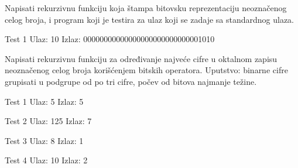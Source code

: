 \begin{Exercise}[label=115]

Napisati rekurzivnu funkciju koja štampa bitovsku
  reprezentaciju neoznačenog celog broja, i program koji je
  testira za ulaz koji se zadaje sa standardnog ulaza.

\begin{maxitest}
\begin{test}{Test 1}
Ulaz:       10                                 
Izlaz:      00000000000000000000000000001010                    
\end{test}
\end{maxitest}
\end{Exercise}

\begin{Exercise}[label=308]
Napisati rekurzivnu funkciju za određivanje
najveće cifre u oktalnom zapisu
neoznačenog celog broja korišćenjem bitskih operatora.
Uputstvo: binarne cifre grupisati u podgrupe od po tri cifre,
počev od bitova najmanje težine.

\begin{minitest}
\begin{test}{Test 1}
Ulaz:  5
Izlaz: 5
\end{test}
\end{minitest}
\begin{minitest}
\begin{test}{Test 2}
Ulaz:  125
Izlaz: 7
\end{test}
\end{minitest}
\begin{minitest}
\begin{test}{Test 3}
Ulaz:  8
Izlaz: 1
\end{test}
\end{minitest}

\begin{minitest}
\begin{test}{Test 4}
Ulaz:  10
Izlaz: 2
\end{test}
\end{minitest}
\end{Exercise}
\begin{Answer}[ref=308]
\end{Answer}

